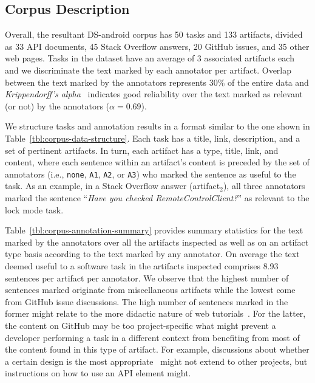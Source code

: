 




\subsection{Corpus Description}
\label{cp4:corpus-description}


Overall, the resultant \acs{DS-android} corpus has
50 tasks and 133 artifacts, divided as 33 API documents, 45 Stack Overflow answers, 20 GitHub issues, and 35 other web pages.
Tasks in the dataset have an average of 3 associated artifacts each
and we discriminate the text marked by each annotator per artifact.
Overlap between the text marked by the annotators represents 30\% of the entire data 
and \textit{Krippendorff's alpha}~\cite{krippendorff2018} indicates 
 good reliability\cite{Nenkova2004} over the text marked as relevant (or not) by the annotators ($\alpha=0.69$).



We structure tasks and annotation results in a format similar to the one shown in 
Table~\ref{tbl:corpus-data-structure}. 
Each task has a  title, link, description, and a set of pertinent artifacts.
In turn, each artifact has a type, title, link, and content,
where each sentence within an artifact's content
is preceded by the set of 
annotators (i.e., \texttt{none}, \texttt{A1}, \texttt{A2}, or \texttt{A3}) who marked the sentence as useful to the task.
As an example, in a Stack Overflow answer (artifact$_2$), all three annotators 
marked the sentence ``\textit{Have you checked RemoteControlClient?}''
as relevant to the lock mode task.



\afterpage{
    
}





Table~\ref{tbl:corpus-annotation-summary} provides summary statistics for the text marked by 
the annotators over all the artifacts inspected as well as on an artifact type basis according to the text marked by any annotator.    
On average the text deemed useful to a software task in the artifacts inspected comprises 
8.93 sentences per artifact per annotator.
We observe that the highest number of sentences marked originate from miscellaneous artifacts
while the lowest come from GitHub issue discussions. 
The high number of sentences marked in the former might relate to the more didactic nature of web tutorials~\cite{arya2020, Jiang2017}.
For the latter, the content on GitHub may be too project-specific what might 
prevent a developer performing a task in a different context from benefiting from most of the content found in this type of artifact.
For example, discussions about whether a certain design is the most appropriate~\cite{Viviani2019} might not extend to other projects, but instructions on how to use an API element might.






